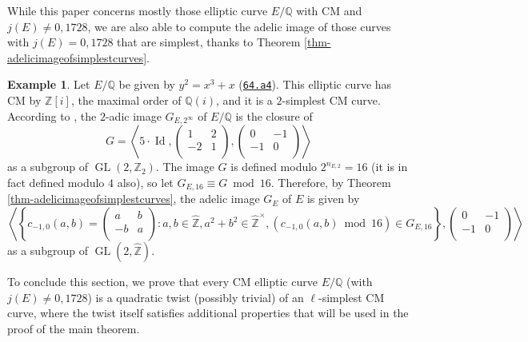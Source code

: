 \documentclass[11pt]{amsart}
\theoremstyle{definition}
\newtheorem{example}[defn]{Example}
\newcommand{\Q}{\mathbb{Q}}
\newcommand{\Z}{\mathbb{Z}}
\newcommand{\GL}{\operatorname{GL}}
\begin{document}
While this paper concerns mostly those elliptic curve $E/\Q$ with CM and $j(E)\neq 0,1728$, we are also able to compute the adelic image of those curves with $j(E)=0,1728$ that are simplest, thanks to Theorem \ref{thm-adelicimageofsimplestcurves}.

 \begin{example}\label{ex-intro3-details} Let $E/\Q$ be given by $y^2=x^3+x$ (\href{https://www.lmfdb.org/EllipticCurve/Q/64/a/4}{\texttt{64.a4}}). This elliptic curve has CM by $\Z[i]$, the maximal order of $\Q(i)$, and it is a $2$-simplest CM curve. According to \cite[Table 4]{modelspaper}, the $2$-adic image $G_{E,2^\infty}$ of $E/\Q$ is the closure of  
     \[ G=\left\langle 5\cdot \operatorname{Id},\left(\begin{array}{cc} 1 & 2\\ -2 & 1\\\end{array}\right), \left(\begin{array}{cc} 0 & -1\\ -1 & 0\\\end{array}\right) \right\rangle\]
     as a subgroup of $\GL(2,\Z_2)$. The image $G$ is defined modulo $2^{n_{E,2}}=16$ (it is in fact defined modulo $4$ also), so let $G_{E,16}\equiv G \bmod 16$. Therefore, by Theorem \ref{thm-adelicimageofsimplestcurves}, the adelic image $G_E$ of $E$ is given by
   $$\left\langle \left\{ c_{-1,0}(a,b)=\left(\begin{array}{cc} a & b\\ -b & a \\\end{array}\right) : a,b \in \widehat{\Z}, a^2+b^2 \in \widehat{\Z}^\times, (c_{-1,0}(a,b) \bmod 16) \in G_{E,16}\right\}, \left(\begin{array}{cc} 0 & -1\\ -1 & 0 \\\end{array}\right)\right\rangle$$
   as a subgroup of $\GL(2,\widehat{\Z})$.
 \end{example}

To conclude this section, we prove that every CM elliptic curve $E/\Q$ (with $j(E)\neq 0,1728$) is a quadratic twist (possibly trivial) of an $\ell$-simplest CM curve, where the twist itself satisfies additional properties that will be used in the proof of the main theorem.
\end{document}
